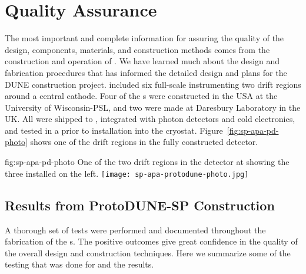 \section{Quality Assurance}
\label{sec:fdsp-apa-qa}



The most important and complete information for assuring the quality of the  design, components, materials, and construction methods comes from the construction and operation of .  We have learned much about the design and fabrication procedures that has informed the detailed design and plans for the DUNE  construction project.  included six full-scale   instrumenting two drift regions around a central cathode.  Four of the  s were constructed in the USA at the University of Wisconsin-PSL, and two were made at Daresbury Laboratory in the UK. All were shipped to , integrated with photon detectors and cold electronics, and tested in a \coldbox prior to installation into the  cryostat.  Figure~\ref{fig:sp-apa-pd-photo} shows one of the drift regions in the fully constructed  detector.

\begin{dunefigure}{fig:sp-apa-pd-photo}
{One of the two drift regions in the  detector at  showing the three installed  on the left.}
\texttt{[image: sp-apa-protodune-photo.jpg]}
\end{dunefigure}


\subsection{Results from ProtoDUNE-SP Construction}
\label{sec:fdsp-apa-qa-protodune-const}

A thorough set of  tests were performed and documented throughout the fabrication of the  s.  The positive outcomes give great confidence in the quality of the overall  design  and construction techniques.  Here we summarize some of the testing that was done for  and the results.   



